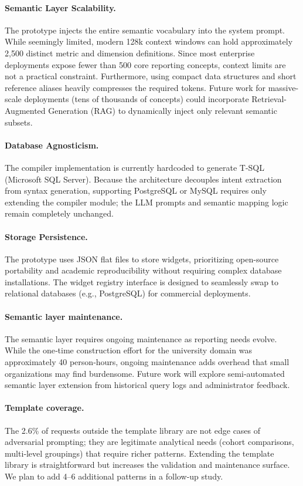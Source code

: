\documentclass[11pt]{article}
\begin{document}
\paragraph{Semantic Layer Scalability.} The prototype injects the entire semantic vocabulary into the system prompt. While seemingly limited, modern 128k context windows can hold approximately 2,500 distinct metric and dimension definitions. Since most enterprise deployments expose fewer than 500 core reporting concepts, context limits are not a practical constraint. Furthermore, using compact data structures and short reference aliases heavily compresses the required tokens. Future work for massive-scale deployments (tens of thousands of concepts) could incorporate Retrieval-Augmented Generation (RAG) to dynamically inject only relevant semantic subsets.

\paragraph{Database Agnosticism.} The compiler implementation is currently hardcoded to generate T-SQL (Microsoft SQL Server). Because the architecture decouples intent extraction from syntax generation, supporting PostgreSQL or MySQL requires only extending the compiler module; the LLM prompts and semantic mapping logic remain completely unchanged.

\paragraph{Storage Persistence.} The prototype uses JSON flat files to store widgets, prioritizing open-source portability and academic reproducibility without requiring complex database installations. The widget registry interface is designed to seamlessly swap to relational databases (e.g., PostgreSQL) for commercial deployments.

\paragraph{Semantic layer maintenance.} The semantic layer requires ongoing maintenance as reporting needs evolve. While the one‑time construction effort for the university domain was approximately 40 person‑hours, ongoing maintenance adds overhead that small organizations may find burdensome. Future work will explore semi‑automated semantic layer extension from historical query logs and administrator feedback.

\paragraph{Template coverage.} The 2.6\% of requests outside the template library are not edge cases of adversarial prompting; they are legitimate analytical needs (cohort comparisons, multi‑level groupings) that require richer patterns. Extending the template library is straightforward but increases the validation and maintenance surface. We plan to add 4–6 additional patterns in a follow‑up study.
\end{document}
